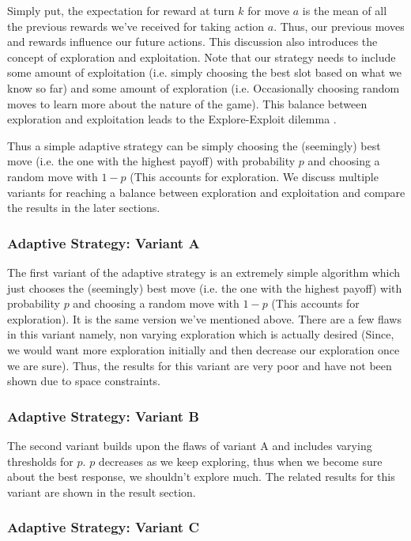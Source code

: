 \documentclass[a4paper]{article}
\begin{document}
Simply put, the expectation for reward at turn $k$ for move $a$ is the mean of all the previous rewards we've received for taking action $a$. Thus, our previous moves and rewards influence our future actions.
This discussion also introduces the concept of exploration and exploitation. Note that our strategy needs to include some amount of exploitation (i.e. simply choosing the best slot based on what we know so far) and some amount of exploration (i.e. Occasionally choosing random moves to learn more about the nature of the game). This balance between exploration and exploitation leads to the Explore-Exploit dilemma \cite{expexp}.

Thus a simple adaptive strategy	can be simply choosing the (seemingly) best move (i.e. the one with the highest payoff) with probability $p$ and choosing a random move with $1-p$ (This accounts for exploration. We discuss multiple variants for reaching a balance between exploration and exploitation and compare the results in the later sections.

	\subsubsection{Adaptive Strategy: Variant A}

	The first variant of the adaptive strategy is an extremely simple algorithm which just chooses the (seemingly) best move (i.e. the one with the highest payoff) with probability $p$ and choosing a random move with $1-p$ (This accounts for exploration). It is the same version we've mentioned above. There are a few flaws in this variant namely, non varying exploration which is actually desired (Since, we would want more exploration initially and then decrease our exploration once we are sure). Thus, the results for this variant are very poor and have not been shown due to space constraints.
	
	\subsubsection{Adaptive Strategy: Variant B}
	
	The second variant builds upon the 	flaws of variant A and includes varying thresholds for $p$. $p$ decreases as we keep exploring, thus when we become sure about the best response, we shouldn't explore much. The related results for this variant are shown in the result section.
	
	\subsubsection{Adaptive Strategy: Variant C}
	
\end{document}
